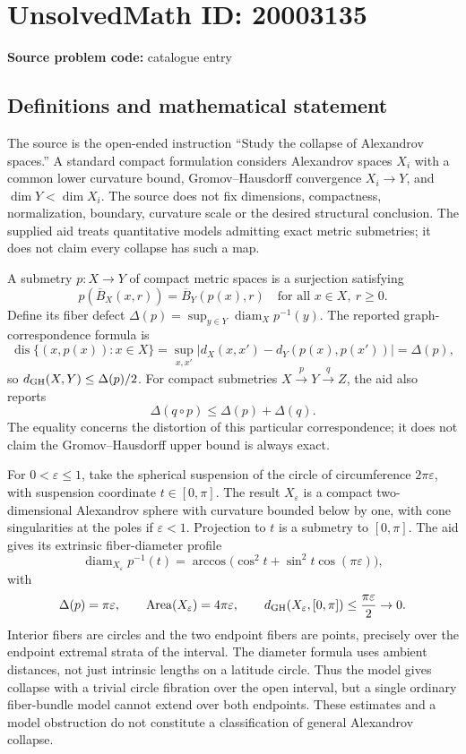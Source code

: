 \documentclass[11pt]{article}
\begin{document}
\section*{UnsolvedMath ID: 20003135}
\textbf{Source problem code:} catalogue entry
\subsection{Definitions and mathematical statement}
The source is the open-ended instruction ``Study the collapse of Alexandrov spaces.'' A standard compact formulation considers Alexandrov spaces \(X_i\) with a common lower curvature bound, Gromov--Hausdorff convergence \(X_i\to Y\), and \(\dim Y<\dim X_i\). The source does not fix dimensions, compactness, normalization, boundary, curvature scale or the desired structural conclusion. The supplied aid treats quantitative models admitting exact metric submetries; it does not claim every collapse has such a map.

A submetry \(p:X\to Y\) of compact metric spaces is a surjection satisfying
\[
p(\overline B_X(x,r))=\overline B_Y(p(x),r)\quad\text{for all }x\in X,\ r\ge0.
\]
Define its fiber defect \(\Delta(p)=\sup_{y\in Y}\operatorname{diam}_X p^{-1}(y)\). The reported graph-correspondence formula is
\[
\operatorname{dis}\{(x,p(x)):x\in X\}
=\sup_{x,x'}|d_X(x,x')-d_Y(p(x),p(x'))|=\Delta(p),
\]
so \(d_{\rm GH}(X,Y)\le\Delta(p)/2\). For compact submetries \(X\xrightarrow pY\xrightarrow qZ\), the aid also reports
\[
\Delta(q\circ p)\le\Delta(p)+\Delta(q).
\]
The equality concerns the distortion of this particular correspondence; it does not claim the Gromov--Hausdorff upper bound is always exact.

For \(0<\varepsilon\le1\), take the spherical suspension of the circle of circumference \(2\pi\varepsilon\), with suspension coordinate \(t\in[0,\pi]\). The result \(X_\varepsilon\) is a compact two-dimensional Alexandrov sphere with curvature bounded below by one, with cone singularities at the poles if \(\varepsilon<1\). Projection to \(t\) is a submetry to \([0,\pi]\). The aid gives its extrinsic fiber-diameter profile
\[
\operatorname{diam}_{X_\varepsilon}p^{-1}(t)=
\arccos\bigl(\cos^2t+\sin^2t\cos(\pi\varepsilon)\bigr),
\]
with
\[
\Delta(p)=\pi\varepsilon,\qquad
\operatorname{Area}(X_\varepsilon)=4\pi\varepsilon,\qquad
d_{\rm GH}(X_\varepsilon,[0,\pi])\le\frac{\pi\varepsilon}{2}\to0.
\]
Interior fibers are circles and the two endpoint fibers are points, precisely over the endpoint extremal strata of the interval. The diameter formula uses ambient distances, not just intrinsic lengths on a latitude circle. Thus the model gives collapse with a trivial circle fibration over the open interval, but a single ordinary fiber-bundle model cannot extend over both endpoints. These estimates and a model obstruction do not constitute a classification of general Alexandrov collapse.
\end{document}
